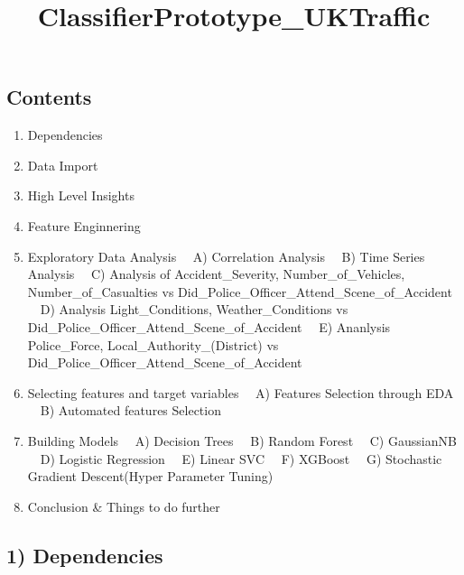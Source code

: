 \documentclass[11pt]{article}
\title{ClassifierPrototype\_UKTraffic}
\begin{document}
    
    
    \maketitle
    
    

    
    \subsection{Contents}\label{contents}

\begin{enumerate}
\def\labelenumi{\arabic{enumi})}
\itemsep1pt\parskip0pt
\item
  Dependencies
\item
  Data Import
\item
  High Level Insights
\item
  Feature Enginnering
\item
  Exploratory Data Analysis  A) Correlation Analysis  B) Time Series
  Analysis  C) Analysis of Accident\_Severity, Number\_of\_Vehicles,
  Number\_of\_Casualties vs
  Did\_Police\_Officer\_Attend\_Scene\_of\_Accident  D) Analysis
  Light\_Conditions, Weather\_Conditions vs
  Did\_Police\_Officer\_Attend\_Scene\_of\_Accident  E) Ananlysis
  Police\_Force, Local\_Authority\_(District) vs
  Did\_Police\_Officer\_Attend\_Scene\_of\_Accident
\item
  Selecting features and target variables  A) Features Selection through
  EDA  B) Automated features Selection
\item
  Building Models  A) Decision Trees  B) Random Forest  C) GaussianNB
   D) Logistic Regression  E) Linear SVC  F) XGBoost  G) Stochastic
  Gradient Descent(Hyper Parameter Tuning)
\item
  Conclusion \& Things to do further
\end{enumerate}

    \subsection{1) Dependencies}\label{dependencies}
\end{document}
